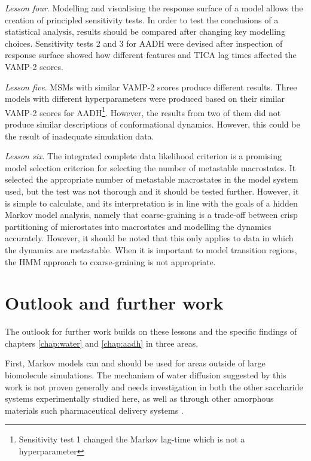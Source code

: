 \emph{Lesson four}. Modelling and visualising the response surface of a model allows the creation of principled sensitivity tests.  In order to test the conclusions of a statistical analysis, results should be compared after changing key modelling choices. Sensitivity tests 2 and 3 for AADH were devised after inspection of response surface showed how different features and TICA lag times affected the VAMP-2 scores.  

\emph{Lesson five}. MSMs with similar VAMP-2 scores produce different results.  Three models with different hyperparameters were produced based on their similar VAMP-2 scores for AADH\footnote{Sensitivity test 1 changed the Markov lag-time which is not a hyperparameter}.  However, the results from two of them did not produce similar descriptions of conformational dynamics.  However, this could be the result of inadequate simulation data.  

\emph{Lesson six}.  The integrated complete data likelihood criterion is a promising model selection criterion for selecting the number of metastable macrostates.  It selected the appropriate number of metastable macrostates in the model system used, but the test was not thorough and it should be tested further.  However, it is simple to calculate, and its interpretation is in line with the goals of a hidden Markov model analysis, namely that coarse-graining is a trade-off between crisp partitioning of microstates into macrostates and modelling the dynamics accurately. However, it should be noted that this only applies to data in which the dynamics are metastable. When it is important to model transition regions, the HMM approach to coarse-graining is not appropriate. 


\section{Outlook and further work}
The outlook for further work builds on these lessons and the specific findings of chapters \ref{chap:water} and \ref{chap:aadh} in three areas. 

First, Markov models can and should be used for areas outside of large biomolecule simulations. The mechanism of water diffusion suggested by this work is not proven generally and needs investigation in both the other saccharide systems experimentally studied here, as well as through other amorphous materials such pharmaceutical delivery systems \cite{hancockCharacteristicsSignificanceAmorphous1997}. 

